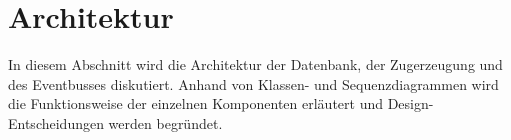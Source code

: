\section{Architektur}

In diesem Abschnitt wird die Architektur der Datenbank, der Zugerzeugung und des Eventbusses diskutiert. Anhand von Klassen- und Sequenzdiagrammen wird die Funktionsweise der einzelnen Komponenten erläutert und Design-Entscheidungen werden begründet.






